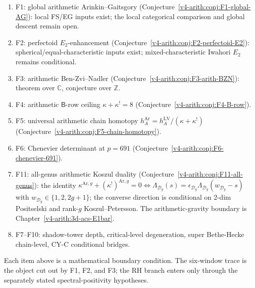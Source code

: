 \begin{enumerate}
\item F1: global arithmetic Arinkin--Gaitsgory
(Conjecture~\ref{v4-arith:conj:F1-global-AG}): local FS/EG inputs exist; the
local categorical comparison and global descent remain open.
\item F2: perfectoid \(E_{2}\)-enhancement
(Conjecture~\ref{v4-arith:conj:F2-perfectoid-E2}): spherical/equal-characteristic
inputs exist; mixed-characteristic Iwahori \(E_{2}\) remains
conditional.
\item F3: arithmetic Ben-Zvi--Nadler
(Conjecture~\ref{v4-arith:conj:F3-arith-BZN}): theorem over \(\mathbb{C}\),
conjecture over \(\mathbb{Z}\).
\item F4: arithmetic \(\mathsf{B}\)-row ceiling \(\kappa+\kappa^{!}=8\)
(Conjecture~\ref{v4-arith:conj:F4-B-row}).
\item F5: universal arithmetic chain homotopy
\(h^{\mathrm{Ar}}_{A}=h^{\mathrm{LV}}_{A}/(\kappa+\kappa^{!})\)
(Conjecture~\ref{v4-arith:conj:F5-chain-homotopy}).
\item F6: Chenevier determinant at \(p=691\)
(Conjecture~\ref{v4-arith:conj:F6-chenevier-691}).
\item F11: all-genus arithmetic Koszul duality
(Conjecture~\ref{v4-arith:conj:F11-all-genus}): the identity
\(\kappa^{\mathrm{Ar},g}+(\kappa^{!})^{\mathrm{Ar},g}=0\Leftrightarrow\Lambda_{\mathcal{D}_g}(s)=\epsilon_{\mathcal{D}_g}\Lambda_{\mathcal{D}_g}(w_{\mathcal{D}_g}-s)\)
with \(w_{\mathcal{D}_g}\in\{1,2,2g+1\}\); the converse direction is
conditional on 2-dim Positselski and rank-\(g\)
Koszul--Petersson. The arithmetic-gravity boundary is
Chapter~\ref{v4-arith:3d-acs-E1bar}.
\item F7--F10: shadow-tower depth, critical-level degeneration,
super Bethe-Hecke chain-level, CY-C conditional bridges.
\end{enumerate}

Each item above is a mathematical boundary condition. The six-window
trace is the object cut out by F1, F2, and F3; the RH branch enters
only through the separately stated spectral-positivity hypotheses.
